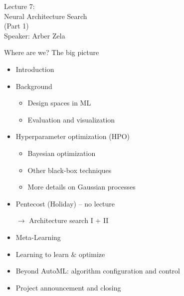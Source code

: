 \newcommand{\algorithmicinput}{\textbf{Input}}
\newcommand{\INPUT}{\item[\algorithmicinput]}
\newcommand{\algorithmicoutput}{\textbf{Output}}
\newcommand{\OUTPUT}{\item[\algorithmicoutput]}

\begin{frame}[c]{}

\centering
\huge
Lecture 7:\\
Neural Architecture Search\\
	(Part 1)\\
\bigskip
\small{Speaker: Arber Zela}
\end{frame}
\begin{frame}[c]{Where are we? The big picture}

\begin{itemize}
	\item Introduction
	\item Background
	\begin{itemize}
		\item Design spaces in ML
		\item Evaluation and visualization
	\end{itemize}
	\item Hyperparameter optimization (HPO)
	\begin{itemize}
		\item Bayesian optimization
		\item Other black-box techniques
		\item More details on Gaussian processes
	\end{itemize}
	\item Pentecost (Holiday) -- no lecture
	\item[$\to$]  Architecture search I + II
	\item Meta-Learning
	\item Learning to learn $\&$ optimize
	\item Beyond AutoML: algorithm configuration and control
	\item Project announcement and closing
\end{itemize}

\end{frame}

